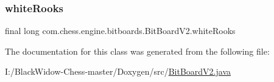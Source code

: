 \mbox{\label{classcom_1_1chess_1_1engine_1_1bitboards_1_1_bit_board_v2_a0b16c01a2b8087b426a60f029fa21303}} 
\subsubsection{\texorpdfstring{whiteRooks}{whiteRooks}}
{\footnotesize\ttfamily final long com.\+chess.\+engine.\+bitboards.\+Bit\+Board\+V2.\+white\+Rooks\hspace{0.3cm}{\ttfamily [private]}}



The documentation for this class was generated from the following file\+:\begin{DoxyCompactItemize}
\item 
I\+:/\+Black\+Widow-\/\+Chess-\/master/\+Doxygen/src/\mbox{\hyperlink{_bit_board_v2_8java}{Bit\+Board\+V2.\+java}}\end{DoxyCompactItemize}
